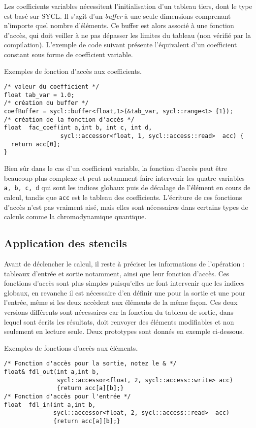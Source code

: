 Les coefficients variables nécessitent l'initialisation d'un tableau tiers, dont le type est basé sur \textsf{SYCL}. Il s'agit d'un \emph{buffer} à une seule dimensions comprenant n'importe quel nombre d'éléments. Ce buffer est alors associé à une fonction d'accès, qui doit veiller à ne pas dépasser les limites du tableau (non vérifié par la compilation). L'exemple de code suivant présente l'équivalent d'un coefficient constant sous forme de coefficient variable.
\begin{listing}[H]
\caption{Exemples de fonction d'accès aux coefficients.}
\begin{verbatim}
/* valeur du coefficient */
float tab_var = 1.0;
/* création du buffer */
coefBuffer = sycl::buffer<float,1>(&tab_var, sycl::range<1> {1});
/* création de la fonction d'accès */
float  fac_coef(int a,int b, int c, int d, 
                sycl::accessor<float, 1, sycl::access::read>  acc) {
  return acc[0];
}
\end{verbatim}
\end{listing}
Bien sûr dans le cas d'un coefficient variable, la fonction d'accès peut être beaucoup plus complexe et peut notamment faire intervenir les quatre variables \verb!a, b, c, d! qui sont les indices globaux puis de décalage de l'élément en cours de calcul, tandis que \verb!acc! est le tableau des coefficients. L'écriture de ces fonctions d'accès n'est pas vraiment aisé, mais elles sont nécessaires dans certains types de calculs comme la chromodynamique quantique.

\subsection{Application des stencils}

Avant de déclencher le calcul, il reste à préciser les informations de l'opération : tableaux d'entrée et sortie notamment, ainsi que leur fonction d'accès. Ces fonctions d'accès sont plus simples puisqu'elles ne font intervenir que les indices globaux, en revanche il est nécessaire d'en définir une pour la sortie et une pour l'entrée, même si les deux accèdent aux éléments de la même façon. Ces deux versions différents sont nécessaires car la fonction du tableau de sortie, dans lequel sont écrits les résultats, doit renvoyer des éléments modifiables et non seulement en lecture seule. Deux prototypes sont donnés en exemple ci-dessous.
\begin{listing}[H]
\caption{Exemples de fonctions d'accès aux éléments.}
\begin{verbatim}
/* Fonction d'accès pour la sortie, notez le & */
float& fdl_out(int a,int b, 
               sycl::accessor<float, 2, sycl::access::write> acc) 
               {return acc[a][b];}
/* Fonction d'accès pour l'entrée */
float  fdl_in(int a,int b, 
              sycl::accessor<float, 2, sycl::access::read>  acc) 
              {return acc[a][b];}
\end{verbatim}
\end{listing}


